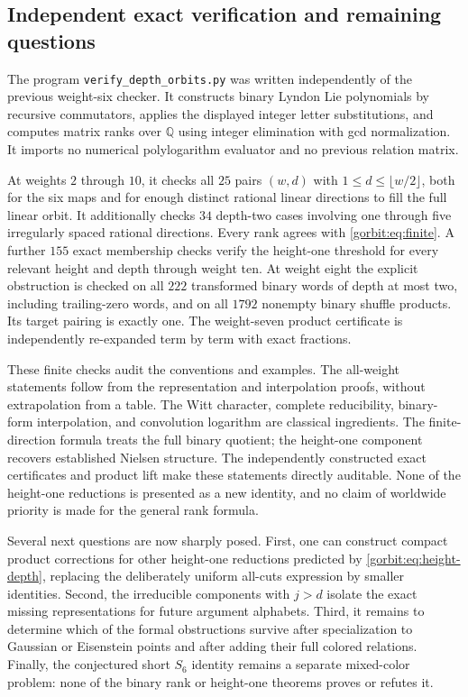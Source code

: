 \subsection{Independent exact verification and remaining questions}

The program \texttt{verify\_depth\_orbits.py} was written independently
of the previous weight-six checker. It constructs binary Lyndon Lie
polynomials by recursive commutators, applies the displayed integer
letter substitutions, and computes matrix ranks over $\mathbb Q$ using
integer elimination with gcd normalization. It imports no numerical
polylogarithm evaluator and no previous relation matrix.

At weights $2$ through $10$, it checks all $25$ pairs
$(w,d)$ with $1\le d\le\lfloor w/2\rfloor$, both for the six maps
and for enough distinct rational linear directions to fill the full
linear orbit. It additionally checks $34$ depth-two cases involving
one through five irregularly spaced rational directions. Every rank
agrees with \eqref{gorbit:eq:finite}. A further $155$ exact membership
checks verify the height-one threshold for every relevant height and
depth through weight ten. At weight eight the explicit
obstruction is checked on all $222$ transformed binary words of depth
at most two, including trailing-zero words, and on all $1792$
nonempty binary shuffle products. Its target pairing is exactly one.
The weight-seven product certificate is independently re-expanded
term by term with exact fractions.

These finite checks audit the conventions and examples. The
all-weight statements follow from the representation and interpolation
proofs, without extrapolation from a table. The Witt character,
complete reducibility, binary-form interpolation, and convolution
logarithm are classical ingredients. The finite-direction formula treats
the full binary quotient; the height-one component recovers established
Nielsen structure. The independently constructed exact certificates and
product lift make these statements directly auditable. None of the
height-one reductions is presented as a new identity, and no claim of
worldwide priority is made for the general rank formula.

Several next questions are now sharply posed. First, one can construct
compact product corrections for other height-one reductions predicted
by \eqref{gorbit:eq:height-depth}, replacing the deliberately uniform
all-cuts expression by smaller identities. Second, the irreducible
components with $j>d$ isolate the exact missing representations for
future argument alphabets. Third, it remains to determine which of the
formal obstructions survive after specialization to Gaussian or
Eisenstein points and after adding their full colored relations.
Finally, the conjectured short $S_6$ identity remains a separate
mixed-color problem: none of the binary rank or height-one theorems
proves or refutes it.

